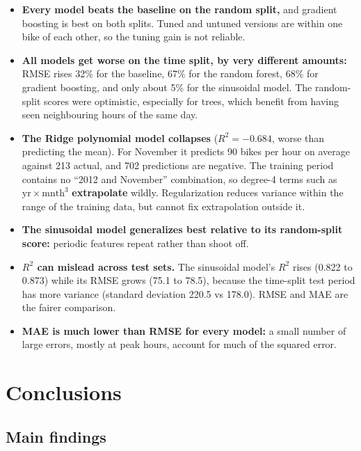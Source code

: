 \documentclass[11pt]{article}
\begin{document}
\begin{itemize}
  \item \textbf{Every model beats the baseline on the random split,} and gradient boosting is best on both
        splits. Tuned and untuned versions are within one bike of each other, so the tuning gain is not reliable.
  \item \textbf{All models get worse on the time split, by very different amounts:} RMSE rises 32\% for the
        baseline, 67\% for the random forest, 68\% for gradient boosting, and only about 5\% for the sinusoidal
        model. The random-split scores were optimistic, especially for trees, which benefit from having seen
        neighbouring hours of the same day.
  \item \textbf{The Ridge polynomial model collapses} ($R^2 = -0.684$, worse than predicting the mean). For
        November it predicts 90 bikes per hour on average against 213 actual, and 702 predictions are negative.
        The training period contains no ``2012 and November'' combination, so degree-4 terms such as
        $\text{yr}\times\text{mnth}^3$ \textbf{extrapolate} wildly. Regularization reduces variance within the
        range of the training data, but cannot fix extrapolation outside it.
  \item \textbf{The sinusoidal model generalizes best relative to its random-split score:} periodic features
        repeat rather than shoot off.
  \item \textbf{$R^2$ can mislead across test sets.} The sinusoidal model's $R^2$ rises (0.822 to 0.873) while its
        RMSE grows (75.1 to 78.5), because the time-split test period has more variance (standard deviation 220.5 vs
        178.0). RMSE and MAE are the fairer comparison.
  \item \textbf{MAE is much lower than RMSE for every model:} a small number of large errors, mostly at peak hours,
        account for much of the squared error.
\end{itemize}

\section{Conclusions}

\subsection{Main findings}
\end{document}
